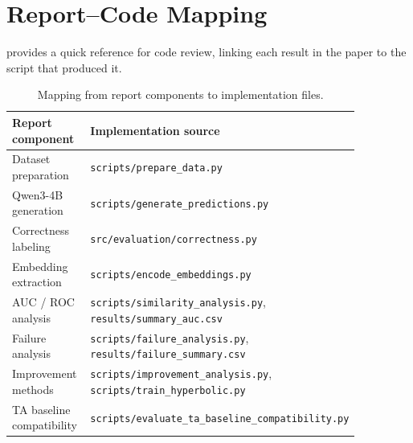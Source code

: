 \documentclass{article}
\begin{document}



\appendix
\section{Report--Code Mapping}
\label{sec:appendix}

 provides a quick reference for code review, linking each result in the paper to the script that produced it.

\begin{table}[ht]
\centering
\caption{Mapping from report components to implementation files.}
\label{tab:code-mapping}
\begin{tabular}{p{0.33\linewidth} p{0.53\linewidth}}
\toprule
\textbf{Report component} & \textbf{Implementation source} \\
\midrule
Dataset preparation & \texttt{scripts/prepare\_data.py} \\
Qwen3-4B generation & \texttt{scripts/generate\_predictions.py} \\
Correctness labeling & \texttt{src/evaluation/correctness.py} \\
Embedding extraction & \texttt{scripts/encode\_embeddings.py} \\
AUC / ROC analysis & \texttt{scripts/similarity\_analysis.py}, \texttt{results/summary\_auc.csv} \\
Failure analysis & \texttt{scripts/failure\_analysis.py}, \texttt{results/failure\_summary.csv} \\
Improvement methods & \texttt{scripts/improvement\_analysis.py}, \texttt{scripts/train\_hyperbolic.py} \\
TA baseline compatibility & \texttt{scripts/evaluate\_ta\_baseline\_compatibility.py} \\
\bottomrule
\end{tabular}
\end{table}
\end{document}
